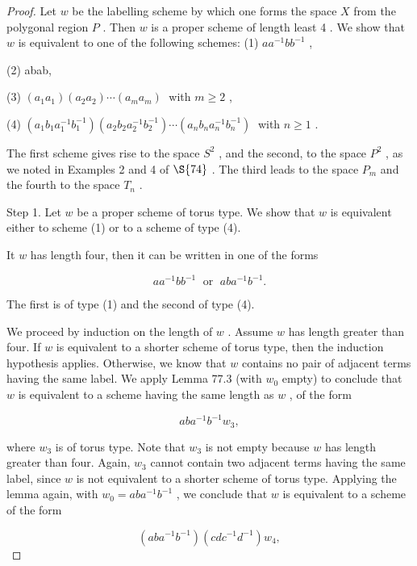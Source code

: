 \begin{proof}Let \(w\) be the labelling scheme by which one forms the space \(X\) from the polygonal region \(P\) . Then \(w\) is a proper scheme of length least 4 . We show that \(w\) is equivalent to one of the following schemes:
(1) \(a{a}^{-1}b{b}^{-1}\) ,

(2) abab,

(3) \(\left( {{a}_{1}{a}_{1}}\right) \left( {{a}_{2}{a}_{2}}\right) \cdots \left( {{a}_{m}{a}_{m}}\right) \;\) with \(m \geq  2\) ,

(4) \(\left( {{a}_{1}{b}_{1}{a}_{1}^{-1}{b}_{1}^{-1}}\right) \left( {{a}_{2}{b}_{2}{a}_{2}^{-1}{b}_{2}^{-1}}\right) \cdots \left( {{a}_{n}{b}_{n}{a}_{n}^{-1}{b}_{n}^{-1}}\right) \;\) with \(n \geq  1\) .

The first scheme gives rise to the space \({S}^{2}\) , and the second, to the space \({P}^{2}\) , as we noted in Examples 2 and 4 of \( \S {74}\) . The third leads to the space \({P}_{m}\) and the fourth to the space \({T}_{n}\) .

Step 1. Let \(w\) be a proper scheme of torus type. We show that \(w\) is equivalent either to scheme (1) or to a scheme of type (4).

It \(w\) has length four, then it can be written in one of the forms

\[
a{a}^{-1}b{b}^{-1}\;\text{ or }\;{ab}{a}^{-1}{b}^{-1}.
\]

The first is of type (1) and the second of type (4).

We proceed by induction on the length of \(w\) . Assume \(w\) has length greater than four. If \(w\) is equivalent to a shorter scheme of torus type, then the induction hypothesis applies. Otherwise, we know that \(w\) contains no pair of adjacent terms having the same label. We apply Lemma 77.3 (with \({w}_{0}\) empty) to conclude that \(w\) is equivalent to a scheme having the same length as \(w\) , of the form

\[
{ab}{a}^{-1}{b}^{-1}{w}_{3},
\]

where \({w}_{3}\) is of torus type. Note that \({w}_{3}\) is not empty because \(w\) has length greater than four. Again, \({w}_{3}\) cannot contain two adjacent terms having the same label, since \(w\) is not equivalent to a shorter scheme of torus type. Applying the lemma again, with \({w}_{0} = {ab}{a}^{-1}{b}^{-1}\) , we conclude that \(w\) is equivalent to a scheme of the form

\[
\left( {{ab}{a}^{-1}{b}^{-1}}\right) \left( {{cd}{c}^{-1}{d}^{-1}}\right) {w}_{4},
\]


\end{proof}
